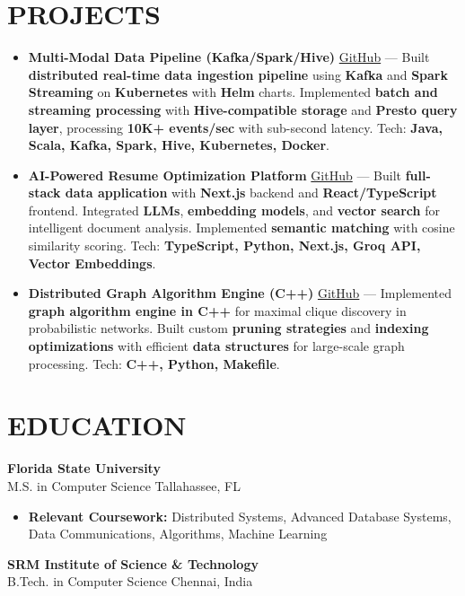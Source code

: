 \documentclass[letterpaper,10pt]{article}
\newcommand{\resumeItem}[1]{\item\small #1}
\newcommand{\resumeSubheading}[4]{
  \vspace{6pt}
  \noindent
  \textbf{#1} \hfill {\footnotesize #2} \\
  [-1pt]
  \noindent
  \small #3 \hfill {\small #4}
  \vspace{3pt}
}
\newcommand{\resumeItemsStart}{\vspace{-2pt}\begin{itemize}}
\newcommand{\resumeItemsEnd}{\end{itemize}\vspace{6pt}}
\begin{document}
\section{\textcolor{metablue}{PROJECTS}}
\vspace{-5pt}
\begin{tcolorbox}[colback=white,colframe=metablue,boxrule=0.8pt,arc=2pt,left=4pt,right=4pt,top=2pt,bottom=2pt]
\begin{itemize}
\resumeItem{\textbf{Multi-Modal Data Pipeline (Kafka/Spark/Hive)} \href{https://github.com/adityasugandhi}{GitHub} --- Built \textbf{distributed real-time data ingestion pipeline} using \textbf{Kafka} and \textbf{Spark Streaming} on \textbf{Kubernetes} with \textbf{Helm} charts. Implemented \textbf{batch and streaming processing} with \textbf{Hive-compatible storage} and \textbf{Presto query layer}, processing \textbf{10K+ events/sec} with sub-second latency. Tech: \textbf{Java, Scala, Kafka, Spark, Hive, Kubernetes, Docker}.}
\resumeItem{\textbf{AI-Powered Resume Optimization Platform} \href{https://github.com/adityasugandhi}{GitHub} --- Built \textbf{full-stack data application} with \textbf{Next.js} backend and \textbf{React/TypeScript} frontend. Integrated \textbf{LLMs}, \textbf{embedding models}, and \textbf{vector search} for intelligent document analysis. Implemented \textbf{semantic matching} with cosine similarity scoring. Tech: \textbf{TypeScript, Python, Next.js, Groq API, Vector Embeddings}.}
\resumeItem{\textbf{Distributed Graph Algorithm Engine (C++)} \href{https://github.com/adityasugandhi/Improved-Algorithms-in-finding-maximal-and-maximum-clique-in-uncertain-networks}{GitHub} --- Implemented \textbf{graph algorithm engine in C++} for maximal clique discovery in probabilistic networks. Built custom \textbf{pruning strategies} and \textbf{indexing optimizations} with efficient \textbf{data structures} for large-scale graph processing. Tech: \textbf{C++, Python, Makefile}.}
\end{itemize}
\end{tcolorbox}
\vspace{-5pt}


\section{\textcolor{metablue}{EDUCATION}}
\vspace{-10pt}
\resumeSubheading
{Florida State University}{}
{M.S. in Computer Science}{Tallahassee, FL}
\resumeItemsStart
\resumeItem{\textbf{Relevant Coursework:} Distributed Systems, Advanced Database Systems, Data Communications, Algorithms, Machine Learning}
\resumeItemsEnd
\vspace{-5pt}
\resumeSubheading
{SRM Institute of Science \& Technology}{}
{B.Tech. in Computer Science}{Chennai, India}
\vspace{-10pt}
\end{document}

